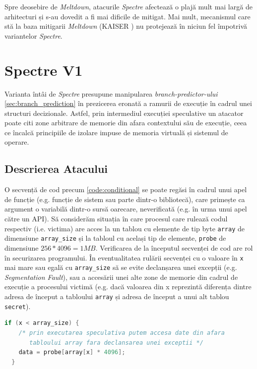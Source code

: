 Spre deosebire de \emph{Meltdown}, atacurile \emph{Spectre} afectează o plajă
mult mai largă de arhitecturi și s-au dovedit a fi mai dificile de mitigat. Mai
mult, mecanismul care stă la baza mitigarii \emph{Meltdown} (KAISER
\cite{gruss2017kaslr}) nu protejează în niciun fel împotrivă variantelor
\emph{Spectre}.

\section{Spectre V1}
\label{sec:spectrev1}

Varianta întâi de \emph{Spectre} presupune manipularea
\emph{branch-predictor-ului} \ref{sec:branch_prediction} în prezicerea eronată
a ramurii de execuție în cadrul unei structuri decizionale. Astfel, prin
intermediul execuției speculative un atacator poate citi zone arbitrare de
memorie din afara contextului său de execuție, ceea ce încalcă principiile de
izolare impuse de memoria virtuală și sistemul de operare. 

\subsection{Descrierea Atacului}

O secvență de cod precum \ref{code:conditional} se poate regăsi în cadrul unui
apel de funcție (e.g. funcție de sistem sau parte dintr-o bibliotecă), care
primește ca argument o variabilă dintr-o sursă oarecare, neverificată (e.g. în
urma unui apel către un API). Să considerăm situația în care procesul care
rulează codul respectiv (i.e. victima) are acces la un tablou cu elemente de
tip byte \texttt{array} de dimensiune \texttt{array\_size} și la tabloul cu
același tip de elemente, \texttt{probe} de dimensiune $256 * 4096 = 1MB$.
Verificarea de la începutul secvenței de cod are rol în securizarea
programului. În eventualitatea rulării secvenței cu o valoare în \texttt{x} mai
mare sau egală cu \texttt{array\_size} să se evite declanșarea unei excepții
(e.g. \emph{Segmentation Fault}), sau a accesării unei alte zone de memorie din
cadrul de execuție a procesului victimă (e.g. dacă valoarea din x reprezintă
diferența dintre adresa de început a tabloului \texttt{array} și adresa de
început a unui alt tablou \texttt{secret}).

\begin{lstlisting}[language=c, label=code:conditional,
                    caption=Executarea speculativă în structura decizională]
  if (x < array_size) {
    /* prin executarea speculativa putem accesa date din afara
       tabloului array fara declansarea unei exceptii */
    data = probe[array[x] * 4096];
  }
\end{lstlisting}

